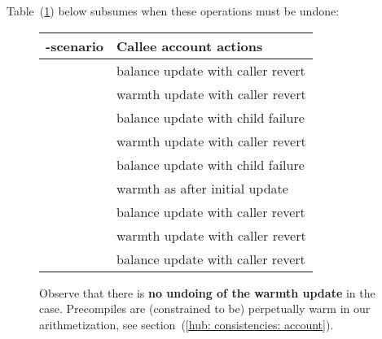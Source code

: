 \noindent Table~(\ref{hub: instruction handling: call: generalities: fig: when to revert warmth and balance}) below subsumes when these operations must be undone:
\begin{figure}
	\begin{center}
		\renewcommand{\arraystretch}{1.5}
		\begin{tabular}{|l|l|}
			\hline
			\inst{CALL}-scenario          & Callee account actions                                 \\ \hline \hline
			\scenCallEoaSuccessWillRevert & \undoSignifier{} balance update with \textcolor{draculapurple}{caller revert}     \\
                                                      & \undoSignifier{} warmth  update with \textcolor{draculapurple}{caller revert}     \\ \hline \hline
			\scenCallSmcFailureWillRevert & \undoSignifier{} balance update with \textcolor{draculaorange}{child failure}     \\
                                                      & \undoSignifier{} warmth  update with \textcolor{draculapurple}{caller revert}     \\ \hline
			\scenCallSmcFailureWontRevert & \undoSignifier{} balance update with \textcolor{draculaorange}{child failure}     \\
                                                      & \sameSignifier{} warmth as after initial update        \\ \hline
			\scenCallSmcSuccessWillRevert & \undoSignifier{} balance update with \textcolor{draculapurple}{caller revert}     \\
                                                      & \undoSignifier{} warmth  update with \textcolor{draculapurple}{caller revert}     \\ \hline \hline
			\scenCallPrcSuccessWillRevert & \undoSignifier{} balance update with \textcolor{draculapurple}{caller revert}     \\ \hline
		\end{tabular}
		\caption{Observe that there is \textbf{no undoing of the warmth update} in the \scenCallPrcSuccessWillRevert{} case. Precompiles are (constrained to be) perpetually warm in our arithmetization, see section~(\ref{hub: consistencies: account}).}
		\label{hub: instruction handling: call: generalities: fig: when to revert warmth and balance}
	\end{center}
\end{figure}

